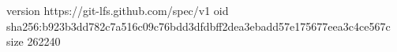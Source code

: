 version https://git-lfs.github.com/spec/v1
oid sha256:b923b3dd782c7a516c09c76bdd3dfdbff2dea3ebadd57e175677eea3c4ce567c
size 262240
